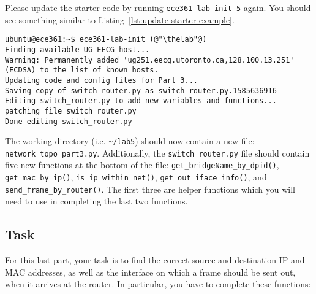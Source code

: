\documentclass[11pt]{article}
\def\thelab{5}
\begin{document}
Please update the starter code by running \texttt{ece361-lab-init \thelab} again. You should see something similar to Listing~\ref{lst:update-starter-example}.

\begin{lstlisting}[style=ece361shell, caption={Updating the lab \thelab~starter code.}, label={lst:update-starter-example}]
ubuntu@ece361:~$ ece361-lab-init (@"\thelab"@)
Finding available UG EECG host...
Warning: Permanently added 'ug251.eecg.utoronto.ca,128.100.13.251' (ECDSA) to the list of known hosts.
Updating code and config files for Part 3...
Saving copy of switch_router.py as switch_router.py.1585636916
Editing switch_router.py to add new variables and functions...
patching file switch_router.py
Done editing switch_router.py
\end{lstlisting}

The working directory (i.e. \texttt{\textasciitilde/lab\thelab}) should now contain a new file: \texttt{network\_topo\_part3.py}.
Additionally, the \texttt{switch\_router.py} file should contain five new functions at the bottom of the file: \texttt{get\_bridgeName\_by\_dpid()}, \texttt{get\_mac\_by\_ip()}, \texttt{is\_ip\_within\_net()}, \texttt{get\_out\_iface\_info()}, and \texttt{send\_frame\_by\_router()}. The first three are helper functions which you will need to use in completing the last two functions.

\subsection{Task}
\label{subsec:routing}
For this last part, your task is to find the correct source and destination IP and MAC addresses, as well as the interface on which a frame should be sent out, when it arrives at the router. In particular, you have to complete these functions:
\end{document}

